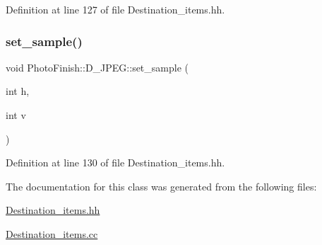 Definition at line 127 of file Destination\+\_\+items.\+hh.

\mbox{\label{class_photo_finish_1_1_d___j_p_e_g_ac5ebc13b15b5d5e88d6f33f5e3074655}} 
\subsubsection{\texorpdfstring{set\+\_\+sample()}{set\_sample()}}
{\footnotesize\ttfamily void Photo\+Finish\+::\+D\+\_\+\+J\+P\+E\+G\+::set\+\_\+sample (\begin{DoxyParamCaption}\item[{int}]{h,  }\item[{int}]{v }\end{DoxyParamCaption})\hspace{0.3cm}{\ttfamily [inline]}}



Definition at line 130 of file Destination\+\_\+items.\+hh.



The documentation for this class was generated from the following files\+:\begin{DoxyCompactItemize}
\item 
\hyperlink{_destination__items_8hh}{Destination\+\_\+items.\+hh}\item 
\hyperlink{_destination__items_8cc}{Destination\+\_\+items.\+cc}\end{DoxyCompactItemize}
